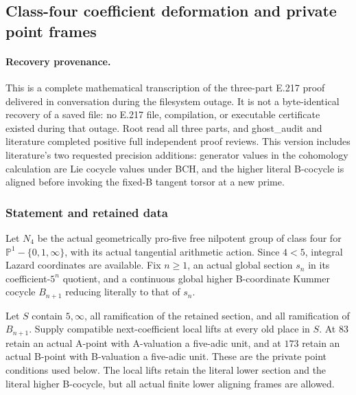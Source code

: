\subsection{Class-four coefficient deformation and private point frames}

\paragraph{Recovery provenance.}
This is a complete mathematical transcription of the three-part E.217 proof delivered in conversation during the filesystem outage. It is not a byte-identical recovery of a saved file: no E.217 file, compilation, or executable certificate existed during that outage. Root read all three parts, and ghost\_audit and literature completed positive full independent proof reviews. This version includes literature's two requested precision additions: generator values in the cohomology calculation are Lie cocycle values under BCH, and the higher literal B-cocycle is aligned before invoking the fixed-B tangent torsor at a new prime.

\subsubsection*{Statement and retained data}
Let $N_4$ be the actual geometrically pro-five free nilpotent group of class four for $\mathbb P^1-\{0,1,\infty\}$, with its actual tangential arithmetic action. Since $4<5$, integral Lazard coordinates are available. Fix $n\ge1$, an actual global section $s_n$ in its coefficient-$5^n$ quotient, and a continuous global higher B-coordinate Kummer cocycle $B_{n+1}$ reducing literally to that of $s_n$.

Let $S$ contain $5,\infty$, all ramification of the retained section, and all ramification of $B_{n+1}$. Supply compatible next-coefficient local lifts at every old place in $S$. At $83$ retain an actual A-point with A-valuation a five-adic unit, and at $173$ retain an actual B-point with B-valuation a five-adic unit. These are the private point conditions used below. The local lifts retain the literal lower section and the literal higher B-cocycle, but all actual finite lower aligning frames are allowed.

